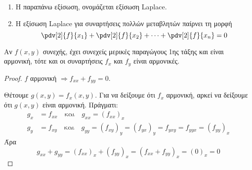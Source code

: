 \begin{rem}
\item {}
  \begin{enumerate}
    \item Η παραπάνω εξίσωση, ονομάζεται \textcolor{Col1}{εξίσωση Laplace}.
    \item Η εξίσωση Laplace για συναρτήσεις πολλών μεταβλητών παίρνει τη 
      μορφή
      \[
        \pdv[2]{f}{x_{1}} + \pdv[2]{f}{x_{2}} + \cdots + 
        \pdv[2]{f}{x_{n}}=0 
      \] 
  \end{enumerate}
\end{rem}

\begin{prop}
\item {}
  Αν $ f(x,y) $ συνεχής, έχει συνεχείς μερικές παραγώγους 1ης τάξης 
  και είναι αρμονική, τότε και οι συναρτήσεις $ f_{x} $ και $ f_{y} $
  είναι αρμονικές. 
\end{prop}
\begin{proof}
\item {}
  $f$ αρμονική $ \Rightarrow f_{xx}+f_{yy}=0 $.

  Θέτουμε $ g(x,y)=f_{x}(x,y) $. Για να δείξουμε ότι $ f_{x} $ αρμονική, 
  αρκεί να δείξουμε ότι $ g(x,y) $ είναι αρμονική. Πράγματι:
  \begin{align*}
    g_{x} &= f_{xx} \quad \text{και} \quad g_{xx} = (f_{xx})_{x} \\ 
    g_{y} &= f_{xy} \quad \text{και} \quad g_{yy} = (f_{xy})_{y} =
    (f_{yx})_{y} = f_{yxy} = f_{yyx} = (f_{yy})_{x}
  \end{align*}
  Άρα 
  \[
    g_{xx}+g_{yy} = (f_{xx})_{x} + (f_{yy})_{x} = 
    (f_{xx}+f_{yy})_{x}= (0)_{x} =0
  \] 
\end{proof}

